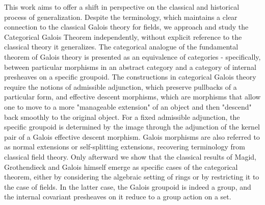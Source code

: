 \documentclass[11pt, a4paper]{article}
\theoremstyle{plain}
\theoremstyle{definition}
\begin{document}
This work aims to offer a shift in perspective on the classical and historical process of generalization. Despite the terminology, which maintains a clear connection to the classical Galois theory for fields, we approach and study the Categorical Galois Theorem independently, without explicit reference to the classical theory it generalizes. The categorical analogue of the fundamental theorem of Galois theory is presented as an equivalence of categories - specifically, between particular morphisms in an abstract category and a category of internal presheaves on a specific groupoid. The constructions in categorical Galois theory require the notions of admissible adjunction, which preserve pullbacks of a particular form, and effective descent morphisms, which are morphisms that allow one to move to a more "manageable extension" of an object and then "descend" back smoothly to the original object. For a fixed admissible adjunction, the specific groupoid is determined by the image through the adjunction of the kernel pair of a Galois effective descent morphism. Galois morphisms are also referred to as normal extensions or self-splitting extensions, recovering terminology from classical field theory. Only afterward we show that the classical results of Magid, Grothendieck and Galois himself emerge as specific cases of the categorical theorem, either by considering the algebraic setting of rings or by restricting it to the case of fields. In the latter case, the Galois groupoid is indeed a group, and the internal covariant presheaves on it reduce to a group action on a set.

\medskip
\end{document}
